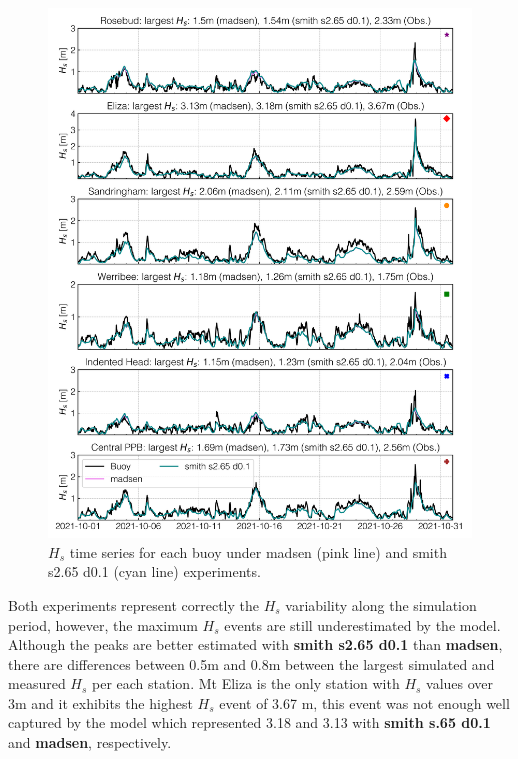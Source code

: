 \documentclass[12pt]{article}
\begin{document}
\begin{figure}[H]
    \centering
    \includegraphics[scale=0.7]{plots/hs_series/madsen_vs_smith s2.65 d0.1_vert.png}
    \caption{$H_{s}$ time series for each buoy under madsen (pink line) and smith s2.65 d0.1 (cyan line) experiments.}
    \label{fig:hs_madsen_vs_smith_def}
\end{figure}

Both experiments represent correctly the $H_s$ variability along the simulation period, however, the maximum $H_s$ events are still underestimated by the model. Although the peaks are better estimated with \textbf{smith s2.65 d0.1} than \textbf{madsen}, there are differences between 0.5m and 0.8m between the largest simulated and measured $H_s$ per each station. Mt Eliza is the only station with $H_s$ values over 3m and it exhibits the highest $H_s$ event of 3.67 m, this event was not enough well captured by the model which represented 3.18 and 3.13 with \textbf{smith s.65 d0.1} and \textbf{madsen}, respectively.
\end{document}
